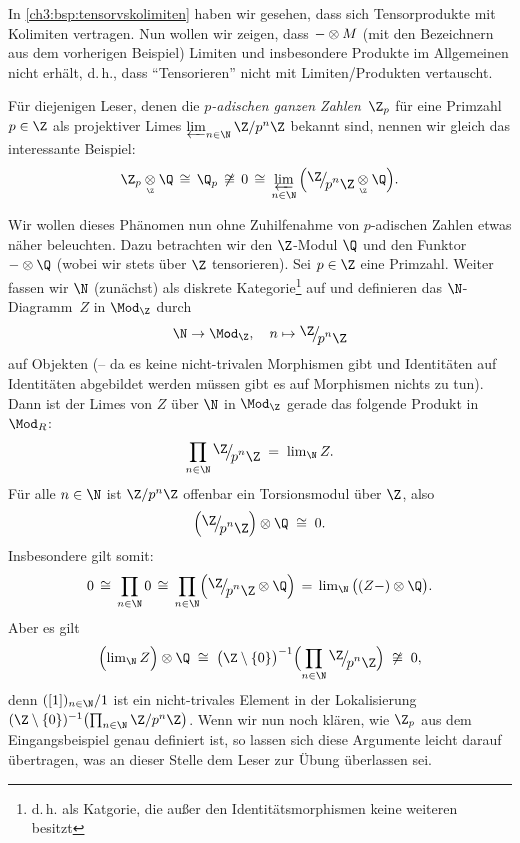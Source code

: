 \begin{thBeispiel}
    \label{ch3:bsp:tensorvslimiten}
    \newcommand{\tensorQ}{\blank\otimes\Q}
    In \cref{ch3:bsp:tensorvskolimiten} haben wir gesehen, dass sich
    Tensorprodukte mit Kolimiten vertragen. Nun wollen wir zeigen, dass
    ${-}\otimes M$ (mit den Bezeichnern aus dem vorherigen Beispiel)
    Limiten und insbesondere Produkte im Allgemeinen nicht erhält, d.\,h.,
    dass \enquote{Tensorieren} nicht mit Limiten/Produkten vertauscht.

    \noindent
    Für diejenigen Leser, denen die \emph{$p$-adischen ganzen Zahlen~$\Z_p$} 
    für eine Primzahl $p\in\Z$ als projektiver Limes $\varprojlim_{n\in\N}
    \txtZQuot{p^n}$ bekannt sind, nennen wir gleich das interessante Beispiel:
    \[ \thickmuskip=8mu
        \Z_p\underset{\scriptscriptstyle\Z}\otimes\Q \cong \Q_p \not\cong 0 
        \cong  \varprojlim_{n\in\N} \,\Bigl( \ZQuot{p^n} 
        \underset{\scriptscriptstyle\Z}\otimes \Q \Bigr)
    . \]

    \noindent
    Wir wollen dieses Phänomen nun ohne Zuhilfenahme von $p$-adischen Zahlen
    etwas näher beleuchten.  Dazu betrachten wir den $\Z$-Modul $\Q$ und den
    Funktor $\tensorQ$ (wobei wir stets über $\Z$ tensorieren). Sei $p\in\Z$
    eine Primzahl. Weiter fassen wir $\N$ (zunächst) als diskrete
    Kategorie\footnote{d.\,h. als Katgorie, die außer den Identitätsmorphismen
    keine weiteren besitzt} auf und definieren das $\N$-Diagramm~$Z$ in
    $\Mod_\Z$ durch
    \[ \N\to\Mod_\Z, \quad n\mapsto \ZQuot{p^n}  \]
    auf Objekten (-- da es keine nicht-trivalen Morphismen gibt und Identitäten
    auf Identitäten abgebildet werden müssen gibt es auf Morphismen nichts zu
    tun). Dann ist der Limes von $Z$ über $\N$ in $\Mod_\Z$ gerade das folgende
    Produkt in $\Mod_R$:
    \[ \prod_{n\in\N} \ZQuot{p^n} \;=\; \lim_\N Z  . \]
    Für alle $n\in\N$ ist $\txtZQuot{p^n}$ offenbar ein Torsionsmodul über $\Z$,
    also
    \[ \Bigl( \ZQuot{p^n} \Bigr) \otimes \Q  \;\cong\; 0  . \]
    Insbesondere gilt somit:
    \[ \thickmuskip=8mu
        0 \cong \prod_{n\in\N} 0 
        \cong \prod_{n\in\N} \Bigl( \ZQuot{p^n} \otimes\Q\Bigr)
        = \lim_\N \,\bigl((Z\blank)\otimes\Q\bigr)
    . \]
    Aber es gilt
    \[ \Bigl( \lim_\N Z \Bigr) \otimes \Q 
        \;\cong\; \bigl(\Z\setminus\{0\}\bigr)^{-1} 
        \Bigl( \prod_{n\in\N} \ZQuot{p^n} \Bigr)
        \;\not\cong\; 0  , 
    \]
    denn $([1])_{n\in\N}/1$ ist ein nicht-trivales Element in der Lokalisierung
    $(\Z\setminus\{0\})^{-1} \bigl( \prod_{n\in\N} \txtZQuot{p^n} \bigr)$.
    Wenn wir nun noch klären, wie $\Z_p$ aus dem Eingangsbeispiel genau
    definiert ist, so lassen sich diese Argumente leicht darauf übertragen, was
    an dieser Stelle dem Leser zur Übung überlassen sei.
    

\end{thBeispiel}
